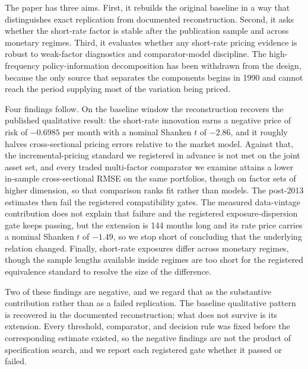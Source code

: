 \documentclass[11pt]{article}
\begin{document}
The paper has three aims. First, it rebuilds the original baseline in a way that
distinguishes exact replication from documented reconstruction. Second, it asks
whether the short-rate factor is stable after the publication sample and across
monetary regimes. Third, it evaluates whether any short-rate pricing evidence is
robust to weak-factor diagnostics and comparator-model discipline. The
high-frequency policy-information decomposition has been withdrawn from the
design, because the only source that separates the components begins in 1990 and %
cannot reach the period supplying most of the variation being priced. %

Four findings follow. On the baseline window the reconstruction recovers the
published qualitative result: the short-rate innovation earns a negative price of
risk of $-0.6985$ per month with a nominal Shanken $t$ of $-2.86$, and it roughly halves %
cross-sectional pricing errors relative to the market model. %
Against that, the incremental-pricing standard we registered in advance is not
met on the joint asset set, and every traded multi-factor comparator we examine
attains a lower in-sample cross-sectional RMSE on the same portfolios, though on
factor sets of higher dimension, so that comparison ranks fit rather than
models. The
post-2013 estimates then fail the registered compatibility gates. The measured %
data-vintage contribution does not explain that failure and the registered
exposure-dispersion gate keeps passing, but the extension is 144 months long and %
its rate price carries a nominal Shanken $t$ of $-1.49$, so we stop short of concluding %
that the underlying relation changed. Finally, short-rate exposures differ across monetary regimes,
though the sample lengths available inside regimes are too short for the
registered equivalence standard to resolve the size of the difference.

Two of these findings are negative, and we regard that as the substantive
contribution rather than as a failed replication. The baseline qualitative pattern
is recovered in the documented reconstruction; what does not survive is its
extension. Every threshold, comparator, and decision
rule was fixed before the corresponding estimate existed, so the negative
findings are not the product of specification search, and we report each
registered gate whether it passed or failed.
\end{document}
